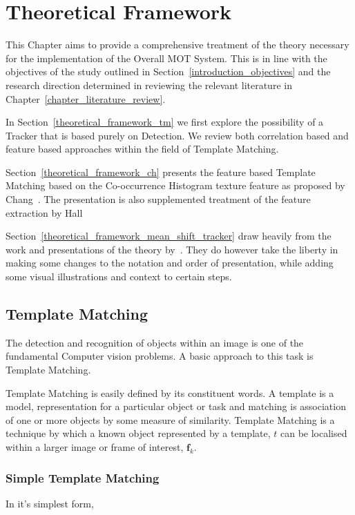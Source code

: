 \chapter{Theoretical Framework}\label{chapter_theoretical_framework}

This Chapter aims to provide a comprehensive treatment of the theory necessary
for the implementation of the Overall MOT System. This is in line with the
objectives of the study outlined in Section~\ref{introduction_objectives} and
the research direction determined in reviewing the relevant literature in
Chapter~\ref{chapter_literature_review}.

In Section~\ref{theoretical_framework_tm} we first explore the possibility of a
Tracker that is based purely on Detection. We review both correlation based and
feature based approaches within the field of Template Matching.

Section~\ref{theoretical_framework_ch} presents the feature based Template
Matching based on the Co-occurrence Histogram texture feature as proposed by
Chang~\cite{Chang}. The presentation is also supplemented treatment of the
feature extraction by Hall~\cite{Hall-beyer2018}

Section~\ref{theoretical_framework_mean_shift_tracker} draw heavily from the
work and presentations of the theory by~\cite{Comaniciu2002, Comaniciu2003,
Shah2011}. They do however take the liberty in making some changes to the
notation and order of presentation, while adding some visual illustrations and
context to certain steps. 


\section{Template Matching}\label{theoretical_framework_template_matching}
The detection and recognition of objects within an image is one of the
fundamental Computer vision problems. A basic approach to this task is Template
Matching.

Template Matching is easily defined by its constituent words. A template is a
model, representation for a particular object or task and matching is
association of one or more objects by some measure of similarity. Template
Matching is a technique by which a known object represented by a template, $t$
can be localised within a larger image or frame of interest, $\mathbf{f}_k$.

\subsection{Simple Template Matching}
In it's simplest form, 

